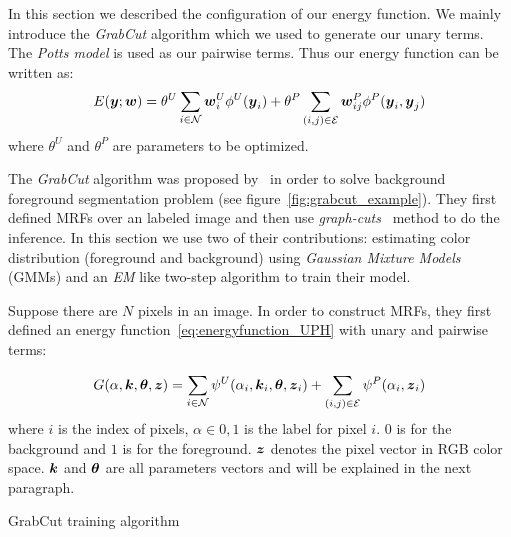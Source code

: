 In this section we described the configuration of our energy
function. We mainly introduce the \emph{GrabCut} algorithm which
we used to generate our unary terms. The \emph{Potts model} is
used as our pairwise terms. Thus our energy function can be
written as:
\begin{align}
  \label{eq:energyfunction_UP}
  E({\boldsymbol{y}};{\boldsymbol{w}})=\theta^U\sum_{i\in {\cal N}}{{\boldsymbol{w}}_i^U\phi^U({\boldsymbol{y}}_i)}+
  \theta^P\sum_{(i,j)\in {\cal E}}{{\boldsymbol{w}}_{ij}^P\phi^P({\boldsymbol{y}}_i,{\boldsymbol{y}}_j)}
\end{align}
\noindent where $\theta^U$ and $\theta^P$ are parameters to be
optimized.

The \emph{GrabCut} algorithm was proposed
by~ in order to solve background
foreground segmentation problem (see
figure~\ref{fig:grabcut_example}). They first defined MRFs over
an labeled image and then use
\emph{graph-cuts}~\cite{Boykov:ICCV01} method to do the
inference. In this section we use two of their contributions:
estimating color distribution (foreground and background) using
\emph{Gaussian Mixture Models} (GMMs) and an \emph{EM} like
two-step algorithm to train their model.

Suppose there are $N$ pixels in an image. In order to construct
MRFs, they first defined an energy
function~\eqref{eq:energyfunction_UPH} with unary and pairwise
terms:

\begin{align}
  \label{eq:grabcut_energy}
  G(\alpha, {\boldsymbol{k}}, \boldsymbol{\theta}, {\boldsymbol{z}}) = 
  \sum_{i\in {\cal N}}{\psi^U(\alpha_i, {\boldsymbol{k}}_i, \boldsymbol{\theta}, {\boldsymbol{z}}_i)}+
  \sum_{(i,j)\in {\cal E}}{\psi^P(\alpha_i,{\boldsymbol{z}}_i)}
\end{align}
where $i$ is the index of pixels, $\alpha \in {0,1}$ is the label
for pixel $i$. $0$ is for the background and $1$ is for the
foreground. ${\boldsymbol{z}}$ denotes the pixel vector in RGB color space.
${\boldsymbol{k}}$ and $\boldsymbol{\theta}$ are all parameters vectors and will be
explained in the next paragraph. 

\begin{algorithm}[tb]
  \begin{algorithmic}[1]
    \REPEAT
  \end{algorithmic}
  \caption{\label{alg:grabcut} GrabCut training algorithm}
\end{algorithm}

